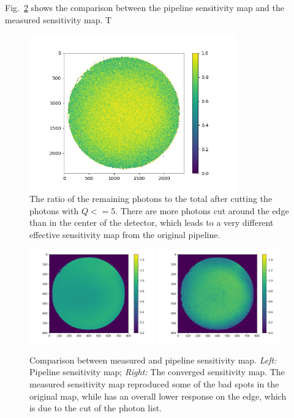 \documentclass[12pt, preprint]{aastex}
\begin{document}
Fig.~\ref{flat} shows the comparison between the pipeline sensitivity map and the measured sensitivity map.
T

\begin{figure}[p]
\begin{center}
\includegraphics[width=0.8\textwidth]{figures/q50}
\end{center}
\caption{
  \label{qcut}
  The ratio of the remaining photons to the total after cutting the photons with $Q<=5$.
  There are more photons cut around the edge than in the center of the detector, which leads to a very different effective sensitivity map from the original pipeline.
}
\end{figure}

\begin{figure}[p]
\begin{center}
\includegraphics[width=0.48\textwidth]{figures/flato}
\includegraphics[width=0.48\textwidth]{figures/flat}
\end{center}
\caption{
  \label{flat}
  Comparison between measured and pipeline sensitivity map.
  \emph{Left:} Pipeline sensitivity map;
  \emph{Right:} The converged sensitivity map.
  The measured sensitivity map reproduced some of the bad spots in the original map, while has an overall lower response on the edge, which is due to the cut of the photon list.
}
\end{figure}
\end{document}
